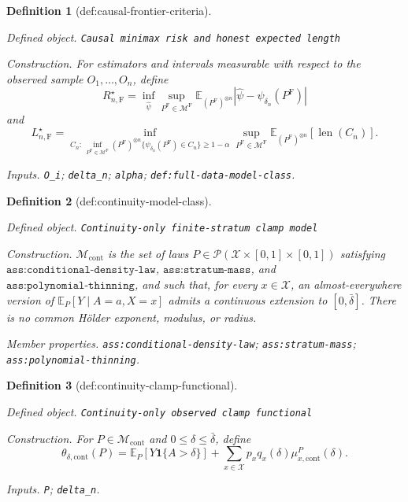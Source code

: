 \documentclass{article}
\newtheorem{definition}{Definition}
\begin{document}
\begin{definition}[def:causal-frontier-criteria]\label{def:causal-frontier-criteria}
\par\smallskip\noindent\emph{Defined object.} \texttt{Causal minimax risk and honest expected length}
\par\smallskip\noindent\emph{Construction.} For estimators and intervals measurable with respect to the observed sample \(O_1,\ldots,O_n\), define
\[
 R_{n,\mathrm F}^\star=\inf_{\widehat\psi}\sup_{P^{\mathrm F}\in\mathcal M^{\mathrm F}}
 \mathbb E_{(P^{\mathrm F})^{\otimes n}}|\widehat\psi-\psi_{\delta_n}(P^{\mathrm F})|
\]
and
\[
 L_{n,\mathrm F}^\star=
 \inf_{C_n:\,\inf_{P^{\mathrm F}\in\mathcal M^{\mathrm F}}
 (P^{\mathrm F})^{\otimes n}\{\psi_{\delta_n}(P^{\mathrm F})\in C_n\}\geq1-\alpha}
 \sup_{P^{\mathrm F}\in\mathcal M^{\mathrm F}}
 \mathbb E_{(P^{\mathrm F})^{\otimes n}}[\operatorname{len}(C_n)].
\]
\par\smallskip\noindent\emph{Inputs.} \texttt{O\_\allowbreak{}i}; \texttt{delta\_\allowbreak{}n}; \texttt{alpha}; \texttt{def:\allowbreak{}full-\allowbreak{}data-\allowbreak{}model-\allowbreak{}class}.
\end{definition}

\begin{definition}[def:continuity-model-class]\label{def:continuity-model-class}
\par\smallskip\noindent\emph{Defined object.} \texttt{Continuity-\allowbreak{}only finite-\allowbreak{}stratum clamp model}
\par\smallskip\noindent\emph{Construction.} \(\mathcal M_{\mathrm{cont}}\) is the set of laws \(P\in\mathcal P(\mathcal X\times[0,1]\times[0,1])\) satisfying \(\texttt{ass:conditional-density-law}\), \(\texttt{ass:stratum-mass}\), and \(\texttt{ass:polynomial-thinning}\), and such that, for every \(x\in\mathcal X\), an almost-everywhere version of \(\mathbb E_P[Y\mid A=a,X=x]\) admits a continuous extension to \([0,\bar\delta]\).  There is no common Hölder exponent, modulus, or radius.
\par\smallskip\noindent\emph{Member properties.} \texttt{ass:\allowbreak{}conditional-\allowbreak{}density-\allowbreak{}law}; \texttt{ass:\allowbreak{}stratum-\allowbreak{}mass}; \texttt{ass:\allowbreak{}polynomial-\allowbreak{}thinning}.
\end{definition}

\begin{definition}[def:continuity-clamp-functional]\label{def:continuity-clamp-functional}
\par\smallskip\noindent\emph{Defined object.} \texttt{Continuity-\allowbreak{}only observed clamp functional}
\par\smallskip\noindent\emph{Construction.} For \(P\in\mathcal M_{\mathrm{cont}}\) and \(0\leq\delta\leq\bar\delta\), define
\[
 \theta_{\delta,\mathrm{cont}}(P)
 =\mathbb E_P[Y\mathbf 1\{A>\delta\}]
 +\sum_{x\in\mathcal X}p_xq_x(\delta)\mu_{x,\mathrm{cont}}^P(\delta).
\]
\par\smallskip\noindent\emph{Inputs.} \texttt{P}; \texttt{delta\_\allowbreak{}n}.
\end{definition}
\end{document}
